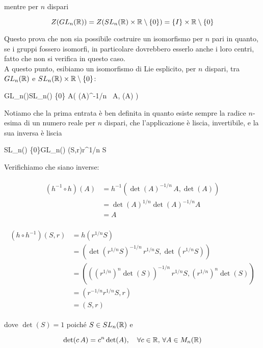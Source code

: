 mentre per $ n $ dispari

\begin{equation}
	Z(GL_{n}(\mathbb{R})) = Z(SL_{n}(\mathbb{R}) \times \mathbb{R} \setminus \{0\}) = \{ I \} \times \mathbb{R} \setminus \{0\}
\end{equation}

Questo prova che non sia possibile costruire un isomorfismo per $ n $ pari in quanto, se i gruppi fossero isomorfi, in particolare dovrebbero esserlo anche i loro centri, fatto che non si verifica in questo caso.\\
A questo punto, esibiamo un isomorfismo di Lie esplicito, per $ n $ dispari, tra $ GL_{n}(\mathbb{R}) $ e $ SL_{n}(\mathbb{R}) \times \mathbb{R} \setminus \{0\} $:

	{GL_{n}(\R)}{SL_{n}(\R) \times \R \setminus \{0\}}
	{A}{\left( \det(A)^{-1/n} \, A, \det(A) \right)}

Notiamo che la prima entrata è ben definita in quanto esiste sempre la radice $ n $-esima di un numero reale per $ n $ dispari, che l'applicazione è liscia, invertibile, e la sua inversa è liscia

	{SL_{n}(\R) \times \R \setminus \{0\}}{GL_{n}(\R)}
	{(S,r)}{r^{1/n} S}
	
Verifichiamo che siano inverse:

\begin{align}
	\begin{split}
		(h^{-1} \circ h)(A) &= h^{-1} \left( \det(A)^{-1/n} \, A, \det(A) \right) \\
		&= \det(A)^{1/n} \det(A)^{-1/n} A \\
		&= A
	\end{split}
\end{align}

\begin{align}
	\begin{split}
		(h \circ h^{-1})(S,r) &= h \left( r^{1/n} S \right) \\
		&= \left( \det(r^{1/n} S)^{-1/n} \, r^{1/n} S, \det(r^{1/n} S) \right) \\
		&= \left( \left( (r^{1/n})^{n} \det(S) \right)^{-1/n} \, r^{1/n} S, (r^{1/n})^{n} \det(S) \right) \\
		&= \left( r^{-1/n} r^{1/n} S, r \right) \\
		&= (S,r)
	\end{split}
\end{align}

dove $ \det(S) = 1 $ poiché $ S \in SL_{n} (\mathbb{R}) $ e

\begin{equation}
	\det(c \, A) = c^{n} \det(A) \qcomma \forall c \in \R, \, \forall A \in M_{n}(\R)
\end{equation}

